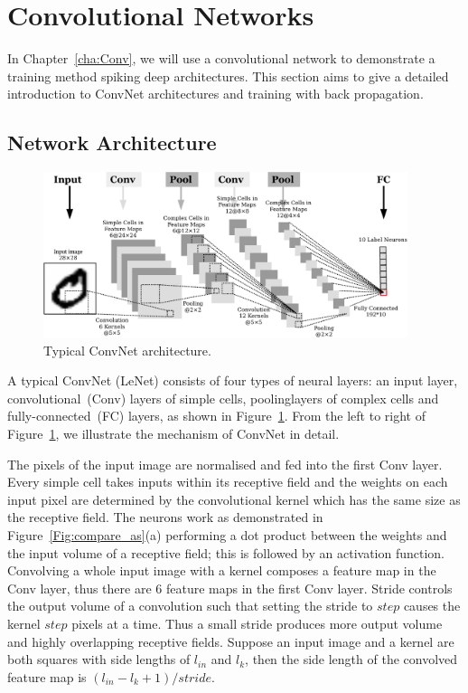 \section{Convolutional Networks}
\label{sec:convnet}
In Chapter~\ref{cha:Conv}, we will use a convolutional network to demonstrate a training method \DIFdelbegin {}\DIFdelend \DIFaddbegin {}\DIFaddend spiking deep architectures.
This section aims to give a detailed introduction to ConvNet architectures and \DIFdelbegin {}\DIFdelend \DIFaddbegin {}\DIFaddend training with back propagation.
\subsection{Network Architecture}

	\begin{figure}[bt]
		\centering
		\includegraphics[width=0.95\textwidth]{pics_snn/convnet.pdf}
		\caption{Typical ConvNet architecture.}
		\label{Fig:ConvNet}
	\end{figure}

A typical ConvNet (LeNet) consists of four types of neural layers: an input layer, convolutional~(Conv) layers of simple cells, pooling\DIFaddbegin {}\DIFaddend layers of complex cells and fully-connected~(FC) layers, as shown in Figure~\ref{Fig:ConvNet}.
From the left to right of Figure~\ref{Fig:ConvNet}, we illustrate the mechanism of \DIFaddbegin {}\DIFaddend ConvNet in detail.

The pixels of the input image are normalised and fed into the first Conv layer.
Every simple cell takes inputs within its receptive field and the weights on each input pixel are determined by the convolutional kernel which has the same size as the receptive field.
The neurons work as demonstrated in Figure~\ref{Fig:compare_as}(a) performing a dot product between the weights and the input volume of a receptive field; this is followed by an activation function.
Convolving a whole input image with a kernel composes a feature map in the Conv layer, thus there are 6 feature maps in the first Conv layer.
Stride controls the output volume of a convolution such that setting the stride to $step$ causes the kernel \DIFdelbegin {}\DIFdelend \DIFaddbegin {}\DIFaddend $step$ pixels at a time.
Thus a small stride produces more output volume and highly overlapping receptive fields.
Suppose an input image and a kernel are both squares with side lengths of $l_{in}$ and $l_k$, then the side length of the convolved feature map is $(l_{in} - l_k + 1)/stride$.

